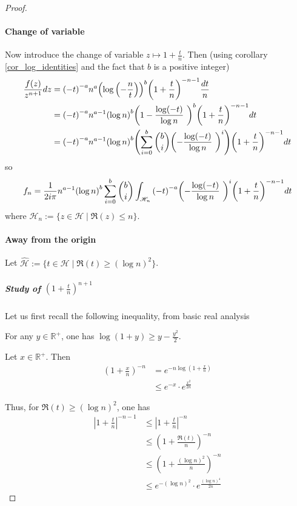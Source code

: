 \documentclass[../main.tex]{subfiles}
\begin{document}
\begin{proof}
	\paragraph{Change of variable}	
	Now introduce the change of variable $z \mapsto 1 + \frac{t}{n}$.
	Then (using corollary \ref{cor_log_identities} and the fact that $b$ is a positive integer)
	\begin{align*}
	\frac{f(z)}{z^{n+1}} dz
	&= {(-t)}^{-a} n^a {\left( \log \left( - \frac{n}{t} \right) \right) }^b {\left( 1 + \frac{t}{n} \right)}^{-n-1} \frac{dt}{n}\\
	&= {(-t)}^{-a} n^{a-1} {(\log n)}^b {\left( 1 - \frac{\log (-t)}{\log n} \right)}^b  {\left( 1 + \frac{t}{n} \right)}^{-n-1} dt\\
	&= {(-t)}^{-a} n^{a-1} {(\log n)}^b
	{\left( \psum{i = 0}^b {b \choose i} {\left( - \frac{\log (-t)}{\log n} \right)}^i \right)}
	{\left( 1 + \frac{t}{n} \right)}^{-n-1} dt
	\end{align*}
	so
	\begin{equation*}
		f_n = \frac{1}{2i\pi} n^{a - 1} {(\log n)}^b \psum{i=0}^b  {b \choose i}
		  \int_{\mathcal{H}_n} {(-t)}^{-a} {\left( - \frac{\log (-t)}{\log n} \right)}^i {\left( 1 + \frac{t}{n} \right)}^{-n-1} dt
	\end{equation*}
	where $\mathcal{H}_n := \{z \in \mathcal{H} \mid \Re(z) \leq n \}$.

	\paragraph{Away from the origin}
	Let $\hat{\mathcal{H}} := \{t \in \mathcal{H} \mid \Re(t) \geq {(\log n)}^2 \}$.
	
	\subparagraph{Study of $\left(1 + \frac{t}{n} \right)^{n+1}$}
	Let us first recall the following inequality, from basic real analysis
	\begin{remark}
		For any $y \in \mathbb{R}^+$, one has $\log (1 + y) \geq y - \frac{y^2}{2}$.
	\end{remark}
	
	Let $x \in \mathbb{R}^+$. Then
	\begin{align*}
	{\left(1 + \frac{x}{n} \right)}^{-n}
	&= e^{-n \log \left( 1 + \frac{x}{n} \right)}\\
	&\leq e^{-x} \cdot e^{\frac{x^2}{2n}}
	\end{align*}
	
	Thus, for $\Re(t) \geq {\left(\log n \right)}^2$, one has
	\begin{align*}
		{\left|1 + \frac{t}{n}\right|}^{-n-1} &\leq {\left|1 + \frac{t}{n}\right|}^{-n}\\
				&\leq {\left(1 + \frac{\Re(t)}{n} \right)}^{-n}\\
				&\leq {\left(1 + \frac{{\left(\log n \right)}^2}{n}\right)}^{-n}\\
				&\leq e^{-{(\log n)}^2} \cdot e^{\frac{{(\log n)}^4}{2n}}
	\end{align*}
	

\end{proof}
\end{document}
